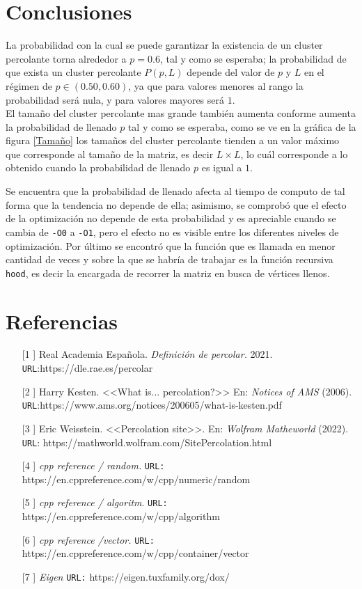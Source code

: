 \documentclass[11pt,twocolumn]{article}
\begin{document}
\section{\textbf{Conclusiones}}
La probabilidad con la cual se puede garantizar la existencia de un cluster percolante torna alrededor a $p=0.6$, tal y como se esperaba; la probabilidad de que exista un cluster percolante $P(p,L)$ depende del valor de $p$ y $L$ en el régimen de $p\in (0.50,0.60)$, ya que para valores menores al rango la probabilidad será nula, y para valores mayores será $1$. \\
El tamaño del cluster percolante mas grande también aumenta conforme aumenta la probabilidad de llenado $p$ tal y como se esperaba, como se ve en la gráfica de la figura \ref{Tamaño} los tamaños del cluster percolante tienden a un valor máximo que corresponde al tamaño de la matriz, es decir $L\times L$, lo cuál corresponde a lo obtenido cuando la probabilidad de llenado $p$ es igual a $1$.

Se encuentra que la probabilidad de llenado afecta al tiempo de computo de tal forma que la tendencia no depende de ella; asimismo, se comprobó que el efecto de la optimización no depende de esta probabilidad y es apreciable cuando se cambia de \texttt{-O0} a \texttt{-O1}, pero el efecto no es visible entre los diferentes niveles de optimización. Por último se encontró que la función que es llamada en menor cantidad de veces y sobre la que se habría de trabajar es la función recursiva \texttt{hood}, es decir la  encargada de recorrer la matriz en busca de vértices llenos.

\printbibliography

\section{Referencias}
\begin{itemize}
    \item[[1]] Real Academia Española. \textit{Definición de percolar.} 2021. \texttt{URL}:https://dle.rae.es/percolar
    \item[[2]] Harry Kesten. <<What is... percolation?>> En: \textit{Notices of AMS} (2006). \texttt{URL}:https://www.ams.org/notices/200605/what-is-kesten.pdf
    \item[[3]] Eric Weisstein. <<Percolation site>>. En: \textit{Wolfram Matheworld} (2022). \texttt{URL}: https://mathworld.wolfram.com/SitePercolation.html
    \item[[4]] \textit{cpp reference / random.} \texttt{URL:}  https://en.cppreference.com/w/cpp/numeric/random
    \item[[5]] \textit{cpp reference / algoritm}. \texttt{URL:} https://en.cppreference.com/w/cpp/algorithm
    \item[[6]] \textit{cpp reference /vector.} \texttt{URL:}  https://en.cppreference.com/w/cpp/container/vector
    \item[[7]] \textit{Eigen} \texttt{URL:} https://eigen.tuxfamily.org/dox/
\end{itemize}
\end{document}
